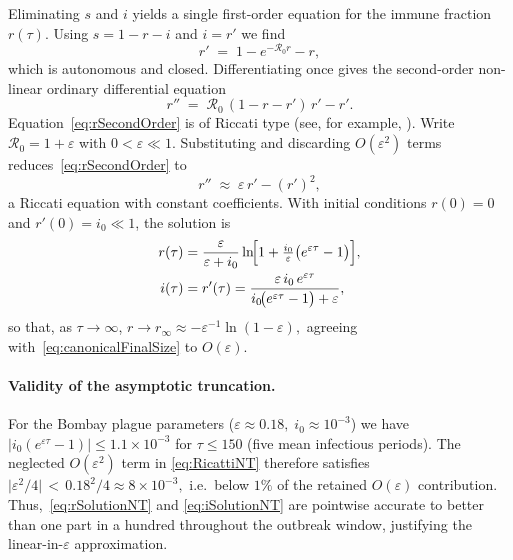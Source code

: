 \documentclass[11pt]{article}
\newcommand{\RR}{\mathcal{R}_0}
\begin{document}
Eliminating $s$ and $i$ yields a single first-order equation for
the immune fraction \(r(\tau)\).  Using
\(s = 1 - r - i\) and \(i = r'\) we find
\begin{equation}\label{eq:rFirstOrder}
  r' \;=\; 1 - e^{-\RR r} - r,
\end{equation}
which is autonomous and closed.  Differentiating once gives the
second-order non-linear ordinary differential equation
\begin{equation}\label{eq:rSecondOrder}
  r'' \;=\; \RR\,(1 - r - r')\,r' - r'.
\end{equation}
Equation~\eqref{eq:rSecondOrder} is of Riccati type
(see, for example, \citet[§1.2]{Polyanin2002}).  Write
\(\RR = 1+\varepsilon\) with \(0<\varepsilon\ll1\).
Substituting and discarding $O(\varepsilon^{2})$ terms
reduces~\eqref{eq:rSecondOrder} to
\begin{equation}\label{eq:RicattiNT}
  r'' \;\approx\; \varepsilon\,r' - (r')^{2},
\end{equation}
a Riccati equation with constant coefficients.
With initial conditions $r(0)=0$ and \(r'(0)=i_0\ll1\),
the solution is
\begin{align}
r(\tau) &=
  \frac{\varepsilon}{\varepsilon+i_0}
  \ln\!\Bigl[1+\tfrac{i_0}{\varepsilon}\bigl(e^{\varepsilon\tau}-1\bigr)\Bigr],
\label{eq:rSolutionNT}\\
i(\tau)&=r'(\tau)=
  \frac{\varepsilon\,i_0\,e^{\varepsilon\tau}}
       {i_0\!\bigl(e^{\varepsilon\tau}-1\bigr)+\varepsilon},
\label{eq:iSolutionNT}
\end{align}
so that, as \(\tau\to\infty\),
\(
r\to r_\infty \approx -\varepsilon^{-1}\ln(1-\varepsilon),
\)
agreeing with~\cref{eq:canonicalFinalSize} to $O(\varepsilon)$.

\paragraph{Validity of the asymptotic truncation.}
For the Bombay plague parameters
(\(\varepsilon\approx0.18,\; i_0\approx10^{-3}\))
we have
\(
|i_0(e^{\varepsilon\tau}-1)|\le1.1\times10^{-3}
\)
for $\tau\le150$ (five mean infectious periods).
The neglected $O(\varepsilon^{2})$ term in
\eqref{eq:RicattiNT} therefore satisfies
\(
\bigl| \varepsilon^{2}/4 \bigr| \,<\, 0.18^{2}/4 \approx 8\times10^{-3},
\)
i.e.\ below $1\%$ of the retained $O(\varepsilon)$ contribution.
Thus,~\eqref{eq:rSolutionNT} and \eqref{eq:iSolutionNT} are pointwise
accurate to better than one part in a hundred throughout the outbreak
window, justifying the linear-in-$\varepsilon$ approximation.
\end{document}
